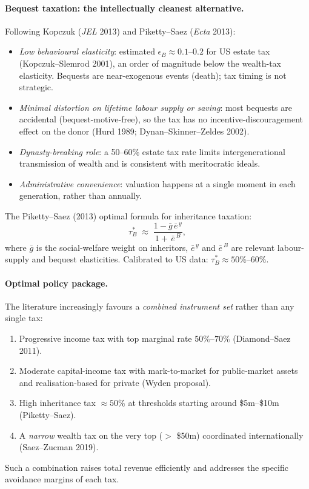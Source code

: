 \documentclass[11pt,a4paper]{article}
\begin{document}
\paragraph{Bequest taxation: the intellectually cleanest alternative.}
Following Kopczuk (\emph{JEL} 2013) and Piketty--Saez (\emph{Ecta} 2013):
\begin{itemize}[leftmargin=*,itemsep=1pt]
    \item \emph{Low behavioural elasticity}: estimated $\epsilon_{B}\approx 0.1$--$0.2$ for US estate tax (Kopczuk--Slemrod 2001), an order of magnitude below the wealth-tax elasticity. Bequests are near-exogenous events (death); tax timing is not strategic.
    \item \emph{Minimal distortion on lifetime labour supply or saving}: most bequests are accidental (bequest-motive-free), so the tax has no incentive-discouragement effect on the donor (Hurd 1989; Dynan--Skinner--Zeldes 2002).
    \item \emph{Dynasty-breaking role}: a 50--60\% estate tax rate limits intergenerational transmission of wealth and is consistent with meritocratic ideals.
    \item \emph{Administrative convenience}: valuation happens at a single moment in each generation, rather than annually.
\end{itemize}
The Piketty--Saez (2013) optimal formula for inheritance taxation:
\[
\tau_{B}^{*}\;\approx\;\frac{1-\bar{g}\,\bar{e}^{\,y}}{1+\,\bar e^{\,B}},
\]
where $\bar g$ is the social-welfare weight on inheritors, $\bar e^{\,y}$ and $\bar e^{\,B}$ are relevant labour-supply and bequest elasticities. Calibrated to US data: $\tau_{B}^{*}\approx 50\%$--$60\%$.

\paragraph{Optimal policy package.}
The literature increasingly favours a \emph{combined instrument set} rather than any single tax:
\begin{enumerate}[leftmargin=*,itemsep=1pt]
    \item Progressive income tax with top marginal rate $50\%$--$70\%$ (Diamond--Saez 2011).
    \item Moderate capital-income tax with mark-to-market for public-market assets and realisation-based for private (Wyden proposal).
    \item High inheritance tax $\approx 50\%$ at thresholds starting around \$5m--\$10m (Piketty--Saez).
    \item A \emph{narrow} wealth tax on the very top ($>$ \$50m) coordinated internationally (Saez--Zucman 2019).
\end{enumerate}
Such a combination raises total revenue efficiently and addresses the specific avoidance margins of each tax.
\end{document}
